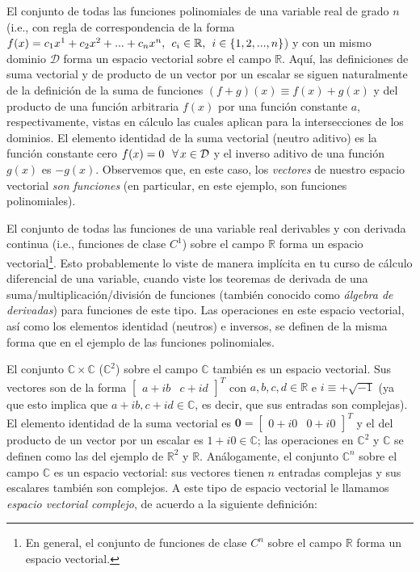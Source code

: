 \documentclass[12pt]{article}
\begin{document}
El conjunto de todas las funciones polinomiales de una variable real de grado $n$ (i.e., con regla de correspondencia de la forma $f(x) = c_1 x^1 + c_2 x^2 + ... + c_n x^n, \hspace{1.5mm} c_i \in \mathbb{R}, \hspace{1.5mm} i \in \{1,2,...,n\}$) y con un mismo dominio $\mathcal{D}$ forma un espacio vectorial sobre el campo $\mathbb{R}$. Aquí, las definiciones de suma vectorial y de producto de un vector por un escalar se siguen naturalmente de la definición de la suma de funciones $(f+g)(x)\equiv f(x)+g(x)$ y del producto de una función arbitraria $f(x)$ por una función constante $a$, respectivamente, vistas en cálculo \textemdash las cuales aplican para la intersecciones de los dominios. El elemento identidad de la suma vectorial (neutro aditivo) es la función constante cero $f(x)=0\hspace{2.5mm} \forall\hspace{0.5mm}x\in\mathcal{D}$ y el inverso aditivo de una función $g(x)$ es $-g(x)$. Observemos que, en este caso, los \textit{vectores} de nuestro espacio vectorial \textit{son funciones} (en particular, en este ejemplo, son funciones polinomiales).

\vspace{3mm}

El conjunto de todas las funciones de una variable real derivables y con derivada continua (i.e., funciones de clase $C^1$) sobre el campo $\mathbb{R}$ forma un espacio vectorial\footnote{En general, el conjunto de funciones de clase $C^n$ sobre el campo $\mathbb{R}$ forma un espacio vectorial.}. Esto probablemente lo viste de manera implícita en tu curso de cálculo diferencial de una variable, cuando viste los teoremas de derivada de una suma/multiplicación/división de funciones (también conocido como \emph{álgebra de derivadas}) para funciones de este tipo. Las operaciones en este espacio vectorial, así como los elementos identidad (neutros) e inversos, se definen de la misma forma que en el ejemplo de las funciones polinomiales.

\vspace{3mm}

El conjunto $\mathbb{C}\times\mathbb{C}$ ($\mathbb{C}^2$) sobre el campo $\mathbb{C}$ también es un espacio vectorial. Sus vectores son de la forma $\begin{bmatrix}a+ib&c+id\end{bmatrix}^T$ con $a,b,c,d\in\mathbb{R}$ e $i\equiv+\sqrt{-1}$ (ya que esto implica que $a+ib, c+id\in\mathbb{C}$, es decir, que sus entradas son complejas). El elemento identidad de la suma vectorial es $\mathbf{0}=\begin{bmatrix}0+i0&0+i0\end{bmatrix}^T$ y el del producto de un vector por un escalar es $1 + i0\in\mathbb{C}$; las operaciones en $\mathbb{C}^2$ y $\mathbb{C}$ se definen como las del ejemplo de $\mathbb{R}^2$ y $\mathbb{R}$. Análogamente, el conjunto $\mathbb{C}^n$ sobre el campo $\mathbb{C}$ es un espacio vectorial: sus vectores tienen $n$ entradas complejas y sus escalares también son complejos. A este tipo de espacio vectorial le llamamos \textit{espacio vectorial complejo}, de acuerdo a la siguiente definición:
\end{document}
